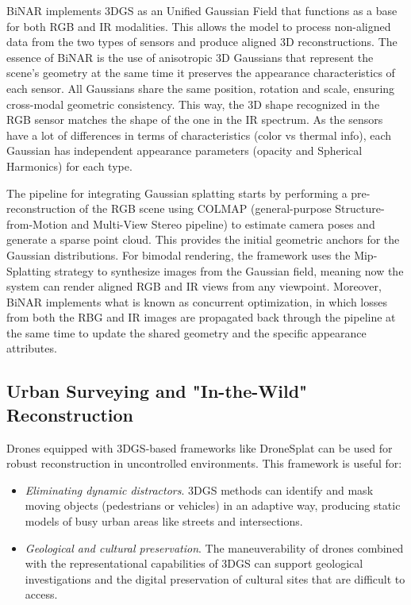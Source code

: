 \documentclass[
	a4paper, %
	10pt, %
	unnumberedsections, %
	twoside, %
]{LTJournalArticle}
\begin{document}
BiNAR implements 3DGS as an Unified Gaussian Field that functions as a base for both RGB and IR modalities. This allows the model to process non-aligned data from the two types of sensors and produce aligned 3D reconstructions. The essence of BiNAR is the use of anisotropic 3D Gaussians that represent the scene's geometry at the same time it preserves the appearance characteristics of each sensor. All Gaussians share the same position, rotation and scale, ensuring cross-modal geometric consistency. This way, the 3D shape recognized in the RGB sensor matches the shape of the one in the IR spectrum. As the sensors have a lot of differences in terms of characteristics (color vs thermal info), each Gaussian has independent appearance parameters (opacity and Spherical Harmonics) for each type.

The pipeline for integrating Gaussian splatting starts by performing a pre-reconstruction of the RGB scene using COLMAP (general-purpose Structure-from-Motion and Multi-View Stereo pipeline) to estimate camera poses and generate a sparse point cloud. This provides the initial geometric anchors for the Gaussian distributions. For bimodal rendering, the framework uses the Mip-Splatting strategy to synthesize images from the Gaussian field, meaning now the system can render aligned RGB and IR views from any viewpoint. Moreover, BiNAR implements what is known as concurrent optimization, in which losses from both the RBG and IR images are propagated back through the pipeline at the same time to update the shared geometry and the specific appearance attributes.


\subsection{Urban Surveying and "In-the-Wild" Reconstruction}

Drones equipped with 3DGS-based frameworks like DroneSplat \cite{dronesplat2025} can be used for robust reconstruction in uncontrolled environments. This framework is useful for:
\begin{itemize}
	\item \textit{Eliminating dynamic distractors}. 3DGS methods can identify and mask moving objects (pedestrians or vehicles) in an adaptive way, producing static models of busy urban areas like streets and intersections.
	\item \textit{Geological and cultural preservation}. The maneuverability of drones combined with the representational capabilities of 3DGS can support geological investigations and the digital preservation of cultural sites that are difficult to access.
\end{itemize}
\end{document}
